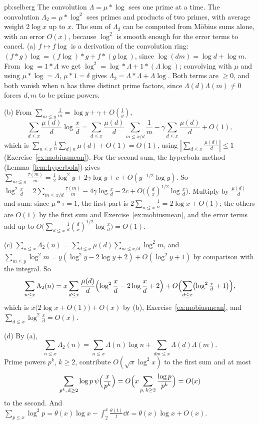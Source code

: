 \begin{solution}{pb:selberg}
\idea The convolution $\Lambda=\mu*\log$ sees one prime at a time. The convolution $\Lambda_2=\mu*\log^2$ sees primes and products of two primes, with average weight $2\log x$ up to $x$. The sum of $\Lambda_2$ can be computed from M\"obius sums alone, with an error $O(x)$, because $\log^2$ is smooth enough for the error terms to cancel.
\writeup (a) $f\mapsto f\log$ is a derivation of the convolution ring: $(f*g)\log=(f\log)*g+f*(g\log)$, since $\log(dm)=\log d+\log m$. From $\log=1*\Lambda$ we get
$\log^2=\log*\Lambda+1*(\Lambda\log)$; convolving with $\mu$ and using $\mu*\log=\Lambda$, $\mu*1=\delta$ gives $\Lambda_2=\Lambda*\Lambda+\Lambda\log$. Both terms are $\ge0$, and both vanish when
$n$ has three distinct prime factors, since $\Lambda(d)\Lambda(m)\ne0$ forces $d,m$ to be prime powers.

(b) From $\sum_{m\le y}\frac1m=\log y+\gamma+O(\frac1y)$,
\[
\sum_{d\le x}\frac{\mu(d)}d\log\frac xd=\sum_{d\le x}\frac{\mu(d)}d\sum_{m\le x/d}\frac1m-\gamma\sum_{d\le x}\frac{\mu(d)}d+O(1),
\]
which is $\sum_{n\le x}\frac1n\sum_{d\mid n}\mu(d)+O(1)=O(1)$, using
$|\sum_{d\le x}\frac{\mu(d)}d|\le1$ (Exercise~\ref{ex:mobiusmean}). For the second sum, the hyperbola method (Lemma~\ref{lem:hyperbola}) gives
$\sum_{m\le y}\frac{\tau(m)}m=\frac12\log^2y+2\gamma\log y+c+O(y^{-1/2}\log y)$. So $\log^2\frac xd=2\sum_{m\le x/d}\frac{\tau(m)}m-4\gamma\log\frac xd-2c+O\bigl((\frac dx)^{1/2}\log\frac xd\bigr)$. Multiply
by $\frac{\mu(d)}d$ and sum: since $\mu*\tau=1$, the first part is $2\sum_{n\le x}\frac1n=2\log x+O(1)$; the others are $O(1)$ by the first sum and Exercise~\ref{ex:mobiusmean}, and the error
terms add up to $O\bigl(\sum_{d\le x}\frac1d(\frac dx)^{1/2}\log\frac xd\bigr)=O(1)$.

(c) $\sum_{n\le x}\Lambda_2(n)=\sum_{d\le x}\mu(d)\sum_{m\le x/d}\log^2m$, and $\sum_{m\le y}\log^2m=y(\log^2y-2\log y+2)+O(\log^2y+1)$ by comparison with the integral. So
\[
\sum_{n\le x}\Lambda_2(n)=x\sum_{d\le x}\frac{\mu(d)}d\Bigl(\log^2\frac xd-2\log\frac xd+2\Bigr)+O\Bigl(\sum_{d\le x}\bigl(\log^2\tfrac xd+1\bigr)\Bigr),
\]
which is $x\bigl(2\log x+O(1)\bigr)+O(x)$ by (b), Exercise~\ref{ex:mobiusmean}, and $\sum_{d\le x}\log^2\frac xd=O(x)$.

(d) By (a),
\[
\sum_{n\le x}\Lambda_2(n)=\sum_{n\le x}\Lambda(n)\log n+\sum_{dm\le x}\Lambda(d)\Lambda(m).
\]
Prime powers $p^k$, $k\ge2$, contribute $O(\sqrt x\log^2x)$ to the first sum and at most
\[
\sum_{p^k,\,k\ge2}\log p\,\psi\Bigl(\frac x{p^k}\Bigr)=O\Bigl(x\sum_{p,\,k\ge2}\frac{\log p}{p^k}\Bigr)=O(x)
\]
to the second. And $\sum_{p\le x}\log^2p=\theta(x)\log x-\int_2^x\frac{\theta(t)}t\dd t=\theta(x)\log x+O(x)$.


\end{solution}

